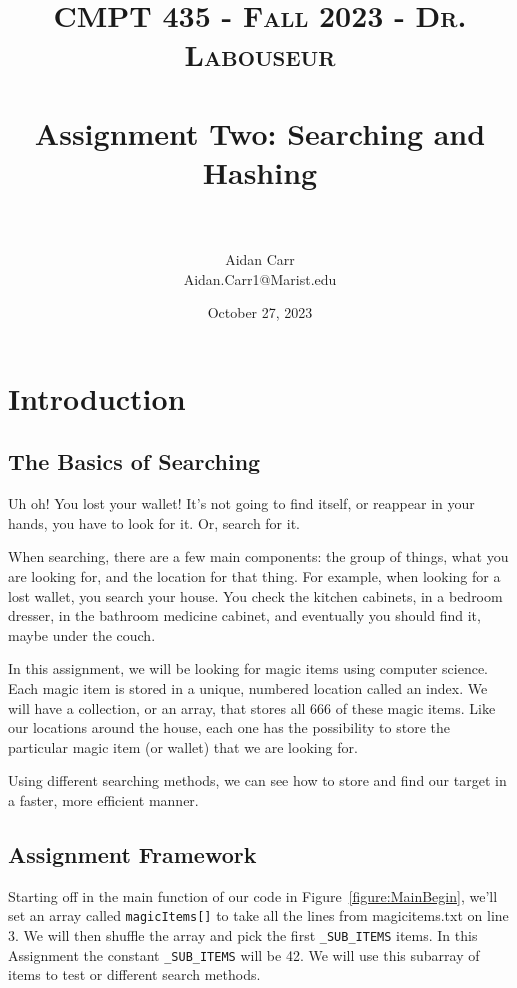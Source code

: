 \documentclass[letterpaper, 10pt,DIV=13]{scrartcl}
\title{	
   \normalfont \normalsize 
   \textsc{CMPT 435 - Fall 2023 - Dr. Labouseur} \\[10pt] %
   \horrule{0.5pt} \\[0.25cm] 	%
   \huge Assignment Two: Searching and Hashing  \\     	    %
   \horrule{0.5pt} \\[0.25cm] 	%
}
\author{Aidan Carr \\ \normalsize Aidan.Carr1@Marist.edu}
\date{\normalsize October 27, 2023} 	%
\numberwithin{equation}{section} %
\numberwithin{figure}{section} %
\numberwithin{table}{section} %
\begin{document}
\maketitle %

\section{Introduction}

\subsection{The Basics of Searching}
Uh oh! You lost your wallet! It's not going to find itself, or reappear in your hands, you have to look for it. Or, search for it. 

When searching, there are a few main components: the group of things, what you are looking for, and the location for that thing. For example, when looking for a lost wallet, you search your house. You check the kitchen cabinets, in a bedroom dresser, in the bathroom medicine cabinet, and eventually you should find it, maybe under the couch. 

In this assignment, we will be looking for magic items using computer science. Each magic item is stored in a unique, numbered location called an index. We will have a collection, or an array, that stores all 666 of these magic items. Like our locations around the house, each one has the possibility to store the particular magic item (or wallet) that we are looking for.

Using different searching methods, we can see how to store and find our target in a faster, more efficient manner.

\subsection{Assignment Framework}
Starting off in the main function of our code in Figure~\ref{figure:MainBegin}, we'll set an array called \texttt{magicItems[]} to take all the lines from magicitems.txt on line 3. We will then shuffle the array and pick the first \texttt{\_SUB\_ITEMS} items. In this Assignment the constant \texttt{\_SUB\_ITEMS} will be 42. We will use this subarray of items to test or different search methods.
\end{document}
